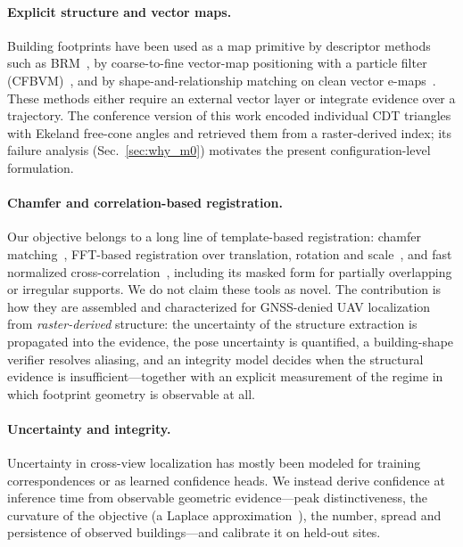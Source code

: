 \paragraph{Explicit structure and vector maps.}
Building footprints have been used as a map primitive by descriptor methods
such as BRM~\cite{choi2020brm}, by coarse-to-fine vector-map positioning with
a particle filter (CFBVM)~\cite{ouyang2024cfbvm}, and by shape-and-relationship
matching on clean vector e-maps~\cite{ssrm2024}. These methods either require
an external vector layer or integrate evidence over a trajectory. The
conference version of this work encoded individual CDT triangles with
Ekeland free-cone angles and retrieved them from a raster-derived index; its
failure analysis (Sec.~\ref{sec:why_m0}) motivates the present
configuration-level formulation.

\paragraph{Chamfer and correlation-based registration.}
Our objective belongs to a long line of template-based registration:
chamfer matching~\cite{barrow1977chamfer,borgefors1988hcma}, FFT-based
registration over translation, rotation and scale~\cite{reddy1996fft}, and
fast normalized cross-correlation~\cite{lewis1995ncc}, including its masked
form for partially overlapping or irregular supports. We do not claim these
tools as novel. The contribution is how they are assembled and characterized
for GNSS-denied UAV localization from \emph{raster-derived} structure: the
uncertainty of the structure extraction is propagated into the evidence,
the pose uncertainty is quantified, a building-shape verifier resolves
aliasing, and an integrity model decides when the structural evidence is
insufficient---together with an explicit measurement of the regime in which
footprint geometry is observable at all.

\paragraph{Uncertainty and integrity.}
Uncertainty in cross-view localization has mostly been modeled for training
correspondences or as learned confidence heads. We instead derive confidence
at inference time from observable geometric evidence---peak distinctiveness,
the curvature of the objective (a Laplace approximation~\cite{mackay2003information}),
the number, spread and persistence of observed buildings---and calibrate it
on held-out sites.
